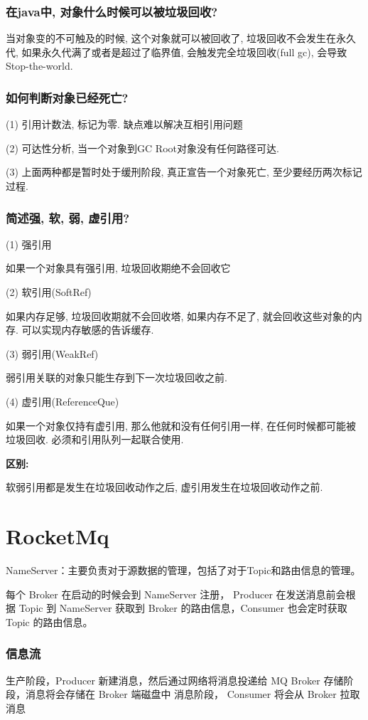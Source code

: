 \documentclass[UTF8]{ctexart}
\begin{document}
\subsubsection{在java中, 对象什么时候可以被垃圾回收?}
当对象变的不可触及的时候, 这个对象就可以被回收了, 垃圾回收不会发生在永久代, 如果永久代满了或者是超过了临界值, 会触发完全垃圾回收(full gc), 会导致Stop-the-world.
\subsubsection{如何判断对象已经死亡?}
(1) 引用计数法, 标记为零. 缺点难以解决互相引用问题 \par
(2) 可达性分析, 当一个对象到GC Root对象没有任何路径可达. \par
(3) 上面两种都是暂时处于缓刑阶段, 真正宣告一个对象死亡, 至少要经历两次标记过程.
\subsubsection{简述强, 软, 弱, 虚引用?}
(1) 强引用 \par
如果一个对象具有强引用, 垃圾回收期绝不会回收它 \par
(2) 软引用(SoftRef) \par
如果内存足够, 垃圾回收期就不会回收塔, 如果内存不足了, 就会回收这些对象的内存. 可以实现内存敏感的告诉缓存. \par
(3) 弱引用(WeakRef) \par
弱引用关联的对象只能生存到下一次垃圾回收之前. \par
(4) 虚引用(ReferenceQue) \par
如果一个对象仅持有虚引用, 那么他就和没有任何引用一样, 在任何时候都可能被垃圾回收. 必须和引用队列一起联合使用.\par
\textbf{区别:} \par
软弱引用都是发生在垃圾回收动作之后, 虚引用发生在垃圾回收动作之前.

\section{RocketMq}

NameServer：主要负责对于源数据的管理，包括了对于Topic和路由信息的管理。

每个 Broker 在启动的时候会到 NameServer 注册，
Producer 在发送消息前会根据 Topic 到 NameServer 获取到 Broker 的路由信息，Consumer 也会定时获取 Topic 的路由信息。


\subsubsection{信息流}
生产阶段，Producer 新建消息，然后通过网络将消息投递给 MQ Broker
存储阶段，消息将会存储在 Broker 端磁盘中
消息阶段， Consumer 将会从 Broker 拉取消息
\end{document}
